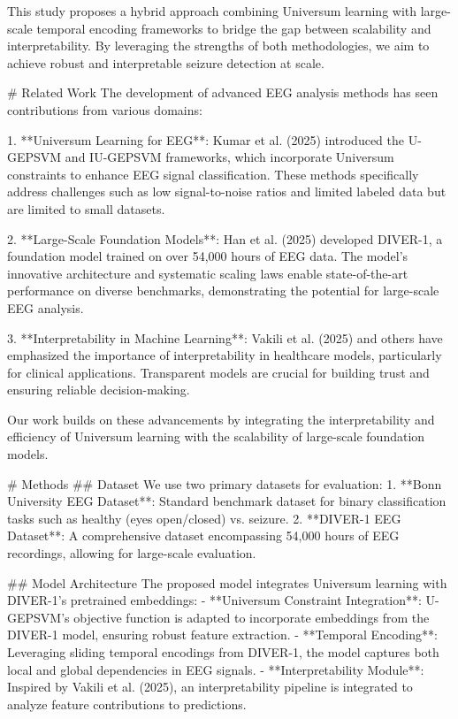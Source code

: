 This study proposes a hybrid approach combining Universum learning with large-scale temporal encoding frameworks to bridge the gap between scalability and interpretability. By leveraging the strengths of both methodologies, we aim to achieve robust and interpretable seizure detection at scale.

# Related Work
The development of advanced EEG analysis methods has seen contributions from various domains:

1. **Universum Learning for EEG**: Kumar et al. (2025) introduced the U-GEPSVM and IU-GEPSVM frameworks, which incorporate Universum constraints to enhance EEG signal classification. These methods specifically address challenges such as low signal-to-noise ratios and limited labeled data but are limited to small datasets.

2. **Large-Scale Foundation Models**: Han et al. (2025) developed DIVER-1, a foundation model trained on over 54,000 hours of EEG data. The model's innovative architecture and systematic scaling laws enable state-of-the-art performance on diverse benchmarks, demonstrating the potential for large-scale EEG analysis.

3. **Interpretability in Machine Learning**: Vakili et al. (2025) and others have emphasized the importance of interpretability in healthcare models, particularly for clinical applications. Transparent models are crucial for building trust and ensuring reliable decision-making.

Our work builds on these advancements by integrating the interpretability and efficiency of Universum learning with the scalability of large-scale foundation models.

# Methods
## Dataset
We use two primary datasets for evaluation:
1. **Bonn University EEG Dataset**: Standard benchmark dataset for binary classification tasks such as healthy (eyes open/closed) vs. seizure.
2. **DIVER-1 EEG Dataset**: A comprehensive dataset encompassing 54,000 hours of EEG recordings, allowing for large-scale evaluation.

## Model Architecture
The proposed model integrates Universum learning with DIVER-1's pretrained embeddings:
- **Universum Constraint Integration**: U-GEPSVM's objective function is adapted to incorporate embeddings from the DIVER-1 model, ensuring robust feature extraction.
- **Temporal Encoding**: Leveraging sliding temporal encodings from DIVER-1, the model captures both local and global dependencies in EEG signals.
- **Interpretability Module**: Inspired by Vakili et al. (2025), an interpretability pipeline is integrated to analyze feature contributions to predictions.

